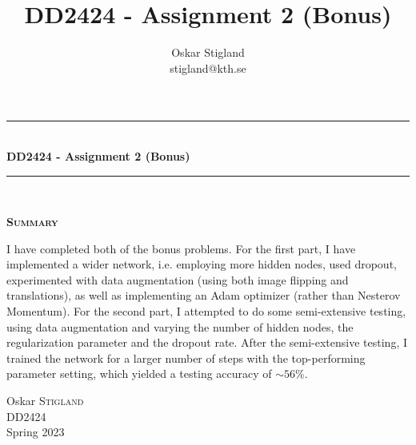 \documentclass{article}
\title{DD2424 - Assignment 2 (Bonus)}
\author{Oskar Stigland \\ stigland@kth.se}
\begin{document}

	\begin{titlepage}
		\begin{center} 
			
			\rule{\linewidth}{0.5mm}\\[0.5 cm]
			{ \huge \bfseries DD2424 - Assignment 2 (Bonus)}\\[0.3 cm] %
			\rule{\linewidth}{0.5mm}\\[1 cm]
					
			\small\vfill
			\begin{center}
			\centering
			{\large \bfseries \textsc{Summary}}\\
			\vspace{1cm}
			\begin{minipage}{10cm}
				
				I have completed both of the bonus problems. For the first part, I have implemented a wider network, i.e. employing more hidden nodes, used dropout, experimented with data augmentation (using both image flipping and translations), as well as implementing an Adam optimizer (rather than Nesterov Momentum). For the second part, I attempted to do some semi-extensive testing, using data augmentation and varying the number of hidden nodes, the regularization parameter and the dropout rate. After the semi-extensive testing, I trained the network for a larger number of steps with the top-performing parameter setting, which yielded a testing accuracy of $\sim 56$\%.
			\end{minipage}
			\end{center}
			\large\vfill
						

		\end{center}	
		
		\begin{minipage}{0.4\textwidth}
			\begin{flushleft} \large
				Oskar \textsc{Stigland}\\
				DD2424\\
				Spring 2023
			\end{flushleft}
		\end{minipage}	

	\end{titlepage}

\newpage
\end{document}
